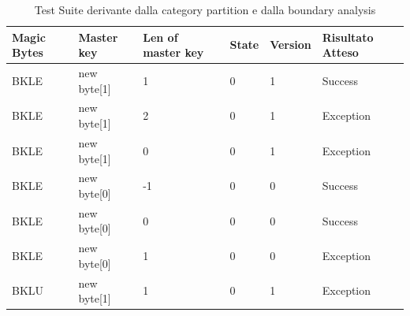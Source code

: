 \documentclass[12pt, a4paper]{article}
\begin{document}

\begin{table}[ht]
  \centering
  \caption[Test Suite - Category Partition]{Test Suite derivante dalla category partition e dalla boundary analysis}
  \begin{tabular}{|l|l|l|l|l|l|}
    \hline
    \textbf{Magic Bytes} & \textbf{Master key} & \textbf{Len of master key}  & \textbf{State} & \textbf{Version} & \textbf{Risultato Atteso} \\
    \hline
    BKLE & new byte[1] & 1 & 0 & 1 & Success \\
    BKLE & new byte[1] & 2 & 0 & 1 & Exception \\
    BKLE & new byte[1] & 0 & 0 & 1 & Exception \\
    BKLE & new byte[0] & -1 & 0 & 0 & Success \\
    BKLE & new byte[0] & 0 & 0 & 0 & Success \\
    BKLE & new byte[0] & 1 & 0 & 0 & Exception \\
    BKLU & new byte[1] & 1 & 0 & 1 & Exception \\
    \hline
  \end{tabular}
  \label{tab:categoryPartition1ReadHeader}
\end{table}




\end{document}
